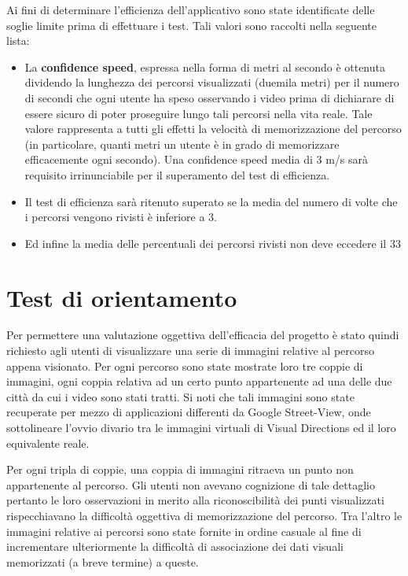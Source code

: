 \documentclass[12pt,a4paper,openright, notitlepage]{report}
\begin{document}
Ai fini di determinare l’efficienza dell’applicativo sono state identificate delle soglie limite prima di effettuare i test. Tali valori sono raccolti nella seguente lista:

\begin{itemize}
	\item La \textbf{confidence speed}, espressa nella forma di metri al secondo è ottenuta dividendo la lunghezza dei percorsi visualizzati (duemila metri) per il numero di secondi che ogni utente ha speso osservando i video prima di dichiarare di essere sicuro di poter proseguire lungo tali percorsi nella vita reale. Tale valore rappresenta a tutti gli effetti la velocità di memorizzazione del percorso (in particolare, quanti metri un utente è in grado di memorizzare efficacemente ogni secondo). Una confidence speed media di 3 m/s sarà requisito irrinunciabile per il superamento del test di efficienza. 
	\item Il test di efficienza sarà ritenuto superato se la media del numero di volte che i percorsi vengono rivisti è inferiore a 3.
	\item Ed infine la media delle percentuali dei percorsi rivisti non deve eccedere il 33%
\end{itemize}

\section{Test di orientamento}

Per permettere una valutazione oggettiva dell’efficacia del progetto è stato quindi richiesto agli utenti di visualizzare una serie di immagini relative al percorso appena visionato. Per ogni percorso sono state mostrate loro tre coppie di immagini, ogni coppia relativa ad un certo punto appartenente ad una delle due città da cui i video sono stati tratti. Si noti che tali immagini sono state recuperate per mezzo di applicazioni differenti da Google Street-View, onde sottolineare l’ovvio divario tra le immagini virtuali di Visual Directions ed il loro equivalente reale.

Per ogni tripla di coppie, una coppia di immagini ritraeva un punto non appartenente al percorso. Gli utenti non avevano cognizione di tale dettaglio pertanto le loro osservazioni in merito alla riconoscibilità dei punti visualizzati rispecchiavano la difficoltà oggettiva di memorizzazione del percorso. Tra l’altro le immagini relative ai percorsi sono state fornite in ordine casuale al fine di incrementare ulteriormente la difficoltà di associazione dei dati visuali memorizzati (a breve termine) a queste.
\end{document}
